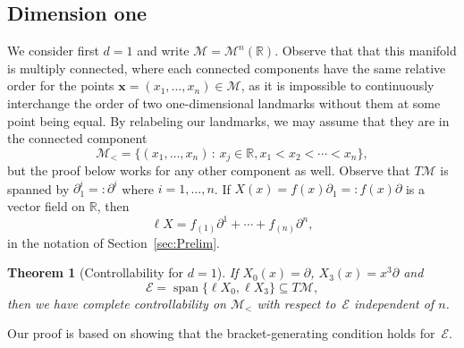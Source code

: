 \documentclass[10pt]{amsart}
\newcounter{dummy} \numberwithin{dummy}{section}
\newtheorem{theorem}[dummy]{Theorem}
\theoremstyle{remark}
\newcommand{\R}{\mathbb{R}}
\DeclareMathOperator{\spn}{span}
\newcommand{\E}{\mathcal{E}}
\newcommand{\LM}{\mathcal{M}}
\numberwithin{equation}{section}
\begin{document}
\subsection{Dimension one}
We consider first $d=1$ and write $\LM = \LM^n(\R)$. Observe that that this manifold is multiply connected, where each connected components have the same relative order for the points $\mathbf{x} = (x_1, \dots, x_n) \in \LM$, as it is impossible to continuously interchange the order of two one-dimensional landmarks without them at some point being equal. By relabeling our landmarks, we may assume that they are in the connected component
$$\LM_{<} = \{ (x_1, \dots, x_n) \, : \, x_j \in \mathbb{R}, x_1 < x_2 < \cdots < x_n\},$$
but the proof below works for any other component as well.
Observe that $T\LM$ is spanned by $\partial^i_1 =: \partial^i$ where $i =1, \dots,n$. If $X(x) = f(x) \partial_1 =: f(x) \partial$ is a vector field on $\R$, then
$$\ell X = f_{(1)} \partial^1 + \cdots + f_{(n)} \partial^n,$$
in the notation of Section~\ref{sec:Prelim}.
\begin{theorem}[Controllability for $d =1$] \label{th:main1}
If $X_0(x) = \partial$, $X_3(x) = x^3 \partial$ and
$$\E = \spn \{ \ell X_0, \ell X_3\}\subseteq T\LM,$$
then we have complete controllability on $\LM_<$ with respect to~$\E$ independent of $n$.
\end{theorem}
Our proof is based on showing that the bracket-generating condition holds for~$\E$.
\end{document}
